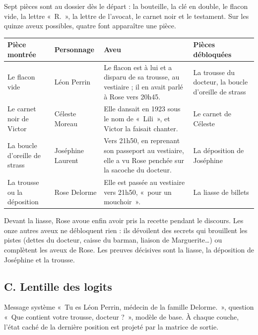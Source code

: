 \documentclass[11pt,a4paper]{article}
\begin{document}
Sept pièces sont au dossier dès le départ : la bouteille, la clé en double, le flacon vide, la lettre «~R.~», la lettre de l'avocat, le carnet noir et le testament. Sur les quinze aveux possibles, quatre font apparaître une pièce.

{\small
\noindent\begin{tabularx}{\textwidth}{@{}>{\raggedright\arraybackslash}p{2.7cm}>{\raggedright\arraybackslash}p{2.3cm}>{\raggedright\arraybackslash}X>{\raggedright\arraybackslash}p{3.2cm}@{}}
\toprule
Pièce montrée & Personnage & Aveu & Pièces débloquées \\
\midrule
Le flacon vide & Léon Perrin & Le flacon est à lui et a disparu de sa trousse, au vestiaire ; il en avait parlé à Rose vers 20h45. & La trousse du docteur, la boucle d'oreille de strass \\
\addlinespace
Le carnet noir de Victor & Céleste Moreau & Elle dansait en 1923 sous le nom de «~Lili~», et Victor la faisait chanter. & Le carnet de Céleste \\
\addlinespace
La boucle d'oreille de strass & Joséphine Laurent & Vers 21h50, en reprenant son passeport au vestiaire, elle a vu Rose penchée sur la sacoche du docteur. & La déposition de Joséphine \\
\addlinespace
La trousse ou la déposition & Rose Delorme & Elle est passée au vestiaire vers 21h50, «~pour un mouchoir~». & La liasse de billets \\
\bottomrule
\end{tabularx}\par}

Devant la liasse, Rose avoue enfin avoir pris la recette pendant le discours. Les onze autres aveux ne débloquent rien : ils dévoilent des secrets qui brouillent les pistes (dettes du docteur, caisse du barman, liaison de Marguerite\ldots) ou complètent les aveux de Rose. Les preuves décisives sont la liasse, la déposition de Joséphine et la trousse.

\subsection*{C. Lentille des logits}

Message système «~Tu es Léon Perrin, médecin de la famille Delorme.~», question «~Que contient votre trousse, docteur ?~», modèle de base. À chaque couche, l'état caché de la dernière position est projeté par la matrice de sortie.
\end{document}
